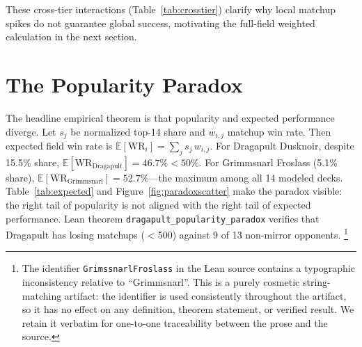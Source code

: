 \documentclass[journal]{IEEEtran}
\newif\ifhighlightchanges
\newcommand{\revised}[1]{\ifhighlightchanges\textcolor{blue!70!black}{#1}\else#1\fi}
\let\origsection\section
\renewcommand{\section}{\needspace{4\baselineskip}\origsection}
\begin{document}
These cross-tier interactions (Table~\ref{tab:crosstier}) clarify why local matchup spikes do not guarantee global success, motivating the full-field weighted calculation in the next section.

\section{The Popularity Paradox}\label{sec:paradox}

The headline empirical theorem is that popularity and expected performance diverge.
Let $s_j$ be normalized top-14 share and $w_{i,j}$ matchup win rate.
Then expected field win rate is $\mathbb{E}[\mathrm{WR}_i] = \sum_j s_j\,w_{i,j}$.
For Dragapult Dusknoir, despite 15.5\% share, $\mathbb{E}[\mathrm{WR}_{\mathrm{Dragapult}}] = 46.7\% < 50\%$.
For Grimmsnarl Froslass (5.1\% share), $\mathbb{E}[\mathrm{WR}_{\mathrm{Grimmsnarl}}] = 52.7\%$---the maximum among all 14 modeled decks.
Table~\ref{tab:expected} and Figure~\ref{fig:paradoxscatter} make the paradox visible: the right tail of popularity is not aligned with the right tail of expected performance.
Lean theorem \texttt{dragapult\_popularity\_paradox} verifies that Dragapult has losing matchups ($<$500) against 9 of 13 non-mirror opponents.%
\footnote{The identifier \texttt{GrimssnarlFroslass} in the Lean source contains a typographic inconsistency relative to ``Grimmsnarl''. \revised{This is a purely cosmetic string-matching artifact: the identifier is used consistently throughout the artifact, so it has no effect on any definition, theorem statement, or verified result. We retain it verbatim for one-to-one traceability between the prose and the source.}}
\end{document}
